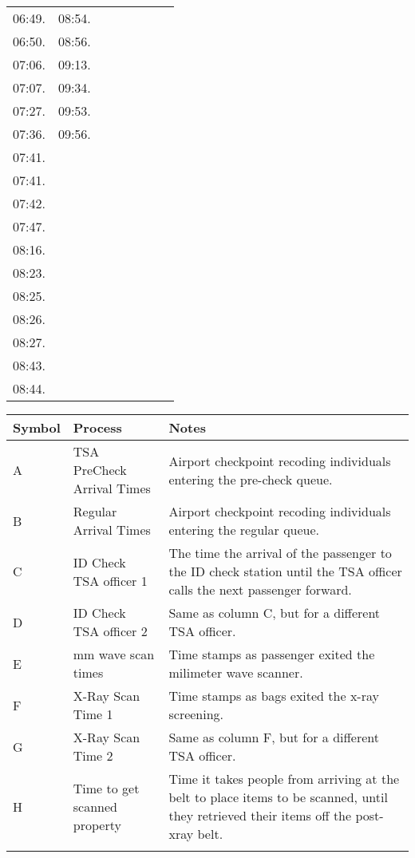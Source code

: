 \documentclass{mcmthesis}
\newlength\savedwidth
\newcommand\whline{\noalign{\global\savedwidth\arrayrulewidth
                            \global\arrayrulewidth 1.2pt}%
                   \hline
                   \noalign{\global\arrayrulewidth\savedwidth}}
\newlength\savewidth
\newcommand\shline{\noalign{\global\savewidth\arrayrulewidth
                            \global\arrayrulewidth 1.2pt}%
                   \hline
                   \noalign{\global\arrayrulewidth\savewidth}}
\begin{document}
\begin{appendices}
\begin{table}[htbp]
\begin{tabular}{m{1.3cm}<{\centering}m{1.3cm}<{\centering}m{1.3cm}<{\centering}m{1.3cm}<{\centering}m{1.3cm}<{\centering}m{1.3cm}<{\centering}m{1.3cm}<{\centering}m{1.3cm}<{\centering}}
06:49.&	08:54.&&&&&&\\						
06:50.&	08:56.&&&&&&\\						
07:06.&	09:13.&&&&&&\\						
07:07.&	09:34.&&&&&&\\						
07:27.&	09:53.&&&&&&\\						
07:36.&	09:56.&&&&&&\\	
07:41.&&&&&&&\\							
07:41.&&&&&&&\\						
07:42.&&&&&&&\\							
07:47.&&&&&&&\\							
08:16.&&&&&&&\\							
08:23.&&&&&&&\\							
08:25.&&&&&&&\\							
08:26.&&&&&&&\\							
08:27.&&&&&&&\\							
08:43.&&&&&&&\\							
08:44.&&&&&&&\\							
\bottomrule
\end{tabular}
\end{table}

\begin{table}[htbp]
\centering
\begin{tabular}{m{1.2cm}<{\centering}|m{3cm}<{\centering}|m{9cm}<{\centering}}
\whline
\textbf{Symbol}&\textbf{Process}&\textbf{Notes}\\
\hline 
A&TSA PreCheck Arrival Times&	Airport checkpoint recoding individuals entering the pre-check queue.\\
\hline 
B&Regular Arrival Times	&Airport checkpoint recoding individuals entering the regular queue.\\
\hline 
C&ID Check TSA officer 1	&The time the arrival of the passenger to the ID check station until the TSA officer calls the next passenger forward.\\
\hline 
D&ID Check TSA officer 2	&Same as column C, but for a different TSA officer.\\
\hline 
E&mm wave scan times	&Time stamps as passenger exited the milimeter wave scanner.\\
\hline 
F&X-Ray Scan Time 1	&Time stamps as bags exited the x-ray screening.\\
\hline 
G&X-Ray Scan Time 2	&Same as column F, but for a different TSA officer.\\
\hline  
H&Time to get scanned property	&Time it takes people from arriving at the belt to place items to be scanned, until they retrieved their items off the post-xray belt.\\
\shline
\end{tabular}
\end{table}








\end{appendices}
\end{document}
